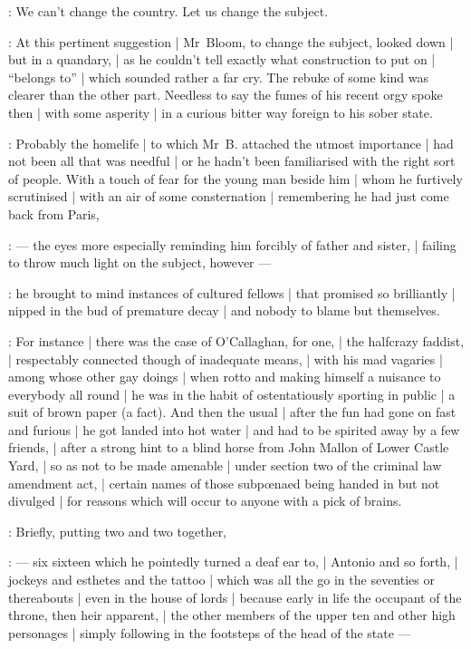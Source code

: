 \Stephen:
We can't change the country.
Let us change the subject.

:
At this pertinent suggestion |
Mr~Bloom, to change the subject, looked down |
but in a quandary, |
as he couldn't tell exactly what construction to put on |
``belongs to'' |
which sounded rather a far cry.
The rebuke of some kind was clearer than the other part.
Needless to say the fumes of his recent orgy spoke then |
with some asperity |
in a curious bitter way foreign to his sober state.

:
Probably the homelife |
to which Mr~B. attached the utmost importance |
had not been all that was needful |
or he hadn't been familiarised with the right sort of people.
With a touch of fear for the young man beside him |
whom he furtively scrutinised |
with an air of some consternation |
remembering he had just come back from Paris,

:
    --- the eyes more especially reminding him forcibly of father and sister, |
        failing to throw much light on the subject, however ---

:
he brought to mind instances of cultured fellows |
that promised so brilliantly |
nipped in the bud of premature decay |
and nobody to blame but themselves.

:
For instance |
there was the case of O'Callaghan, for one, |
the halfcrazy faddist, |
respectably connected though of inadequate means, |
with his mad vagaries |
among whose other gay doings |
when rotto and making himself a nuisance to everybody all round |
he was in the habit of ostentatiously sporting in public |
a suit of brown paper (a fact).
And then the usual  |
after the fun had gone on fast and furious |
he got landed into hot water |
and had to be spirited away by a few friends, |
after a strong hint to a blind horse from John Mallon of Lower Castle Yard, |
so as not to be made amenable |
under section two of the criminal law amendment act, |
certain names of those subpœnaed being handed in but not divulged |
for reasons which will occur to anyone with a pick of brains.

:
Briefly, putting two and two together,

:
    --- six sixteen which he pointedly turned a deaf ear to, |
        Antonio and so forth, |
        jockeys and esthetes and the tattoo |
        which was all the go in the seventies or thereabouts |
        even in the house of lords |
        because early in life the occupant of the throne, then heir apparent, |
        the other members of the upper ten and other high personages |
        simply following in the footsteps of the head of the state ---

